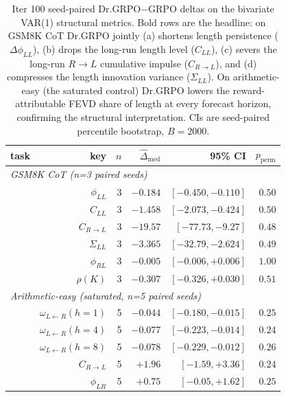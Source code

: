 \begin{table}[t]
\centering\small
\begin{tabular}{lrrrrr}
\hline
task & key & $n$ & $\widehat{\Delta}_{\mathrm{med}}$ & 95\% CI & $p_{\mathrm{perm}}$ \\
\hline
\multicolumn{6}{l}{\emph{GSM8K CoT (n=3 paired seeds)}} \\
   & $\phi_{LL}$              & 3 & $\mathbf{-0.184}$ &$\mathbf{[-0.450, -0.110]}$ & $0.50$ \\
   & $C_{LL}$                 & 3 & $\mathbf{-1.458}$ & $\mathbf{[-2.073, -0.424]}$ & $0.50$ \\
   & $C_{R\to L}$             & 3 & $\mathbf{-19.57}$ & $\mathbf{[-77.73, -9.27]}$  & $0.48$ \\
   & $\Sigma_{LL}$            & 3 & $\mathbf{-3.365}$ & $\mathbf{[-32.79, -2.624]}$ & $0.49$ \\
   & $\phi_{RL}$              & 3 & $-0.005$ & $[-0.006,+0.006]$ & $1.00$ \\
   & $\rho(K)$                & 3 & $-0.307$ & $[-0.326,+0.030]$ & $0.51$ \\
\multicolumn{6}{l}{\emph{Arithmetic-easy (saturated, n=5 paired seeds)}} \\
   & $\omega_{L\leftarrow R}(h\!=\!1)$ & 5 & $\mathbf{-0.044}$ & $\mathbf{[-0.180, -0.015]}$ & $0.25$ \\
   & $\omega_{L\leftarrow R}(h\!=\!4)$ & 5 & $\mathbf{-0.077}$ & $\mathbf{[-0.223, -0.014]}$ & $0.24$ \\
   & $\omega_{L\leftarrow R}(h\!=\!8)$ & 5 & $\mathbf{-0.078}$ & $\mathbf{[-0.229, -0.012]}$ & $0.26$ \\
   & $C_{R\to L}$             & 5 & $+1.96$  & $[-1.59,+3.36]$  & $0.24$ \\
   & $\phi_{LR}$              & 5 & $+0.75$  & $[-0.05,+1.62]$  & $0.25$ \\
\hline
\end{tabular}
\caption{Iter 100 seed-paired Dr.GRPO$-$GRPO deltas on the bivariate
VAR(1) structural metrics.  Bold rows are the headline: on GSM8K CoT
Dr.GRPO jointly (a) shortens length persistence ($\Delta\phi_{LL}$),
(b) drops the long-run length level ($C_{LL}$), (c) severs the long-run
$R\!\to\!L$ cumulative impulse ($C_{R\!\to\!L}$), and (d) compresses the
length innovation variance ($\Sigma_{LL}$).  On arithmetic-easy (the
saturated control) Dr.GRPO lowers the reward-attributable FEVD share
of length at every forecast horizon, confirming the structural
interpretation.  CIs are seed-paired percentile bootstrap, $B\!=\!2000$.}
\label{tab:lb-iter100-paired}
\end{table}

